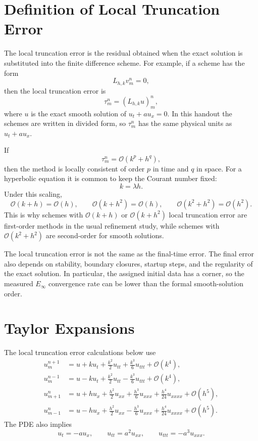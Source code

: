 \documentclass[11pt]{article}
\newcommand{\Oh}{\mathcal{O}}
\begin{document}
\section{Definition of Local Truncation Error}

The local truncation error is the residual obtained when the exact solution is
substituted into the finite difference scheme.  For example, if a scheme has the form
\begin{equation}
    L_{h,k}v_m^n=0,
\end{equation}
then the local truncation error is
\begin{equation}
    \tau_m^n=(L_{h,k}u)_m^n,
\end{equation}
where $u$ is the exact smooth solution of $u_t+a u_x=0$.  In this handout the schemes
are written in divided form, so $\tau_m^n$ has the same physical units as
$u_t+a u_x$.

If
\begin{equation}
    \tau_m^n=\Oh(k^p+h^q),
\end{equation}
then the method is locally consistent of order $p$ in time and $q$ in space.  For a
hyperbolic equation it is common to keep the Courant number fixed:
\begin{equation}
    k=\lambda h.
\end{equation}
Under this scaling,
\begin{equation}
    \Oh(k+h)=\Oh(h),\qquad
    \Oh(k+h^2)=\Oh(h),\qquad
    \Oh(k^2+h^2)=\Oh(h^2).
\end{equation}
This is why schemes with $\Oh(k+h)$ or $\Oh(k+h^2)$ local truncation error are
first-order methods in the usual refinement study, while schemes with
$\Oh(k^2+h^2)$ are second-order for smooth solutions.

The local truncation error is not the same as the final-time error.  The final error
also depends on stability, boundary closures, startup steps, and the regularity of the
exact solution.  In particular, the assigned initial data has a corner, so the measured
$E_\infty$ convergence rate can be lower than the formal smooth-solution order.

\section{Taylor Expansions}

The local truncation error calculations below use
\begin{align}
    u_m^{n+1}
    &=u+k u_t+\frac{k^2}{2}u_{tt}+\frac{k^3}{6}u_{ttt}+\Oh(k^4),\\
    u_m^{n-1}
    &=u-k u_t+\frac{k^2}{2}u_{tt}-\frac{k^3}{6}u_{ttt}+\Oh(k^4),\\
    u_{m+1}^n
    &=u+h u_x+\frac{h^2}{2}u_{xx}+\frac{h^3}{6}u_{xxx}
    +\frac{h^4}{24}u_{xxxx}+\Oh(h^5),\\
    u_{m-1}^n
    &=u-h u_x+\frac{h^2}{2}u_{xx}-\frac{h^3}{6}u_{xxx}
    +\frac{h^4}{24}u_{xxxx}+\Oh(h^5).
\end{align}
The PDE also implies
\begin{equation}
    u_t=-a u_x,\qquad u_{tt}=a^2u_{xx},\qquad u_{ttt}=-a^3u_{xxx}.
\end{equation}
\end{document}

